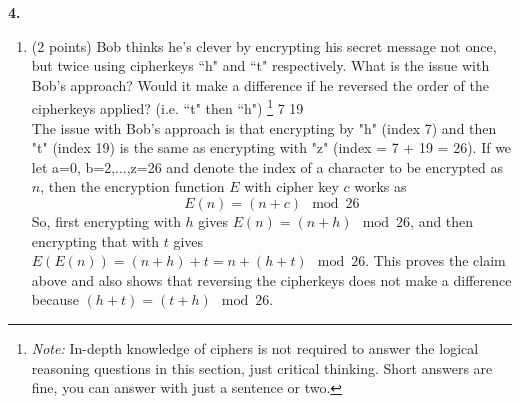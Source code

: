 \documentclass[12pt]{amsart}
\newenvironment{statement}[1]{\smallskip\noindent\color[rgb]{0.0,0.0,0.0} {\bf #1.}}{}
\theoremstyle{definition}
\theoremstyle{remark}
\newcommand{\1}{\mathds{1}}
\begin{document}
\begin{statement}{4}
\begin{enumerate}
\begin{enumerate}
            \item (2 points) Bob thinks he's clever by encrypting his secret message not once, but twice using cipherkeys ``h" and ``t" respectively. What is the issue with Bob's approach? Would it make a difference if he reversed the order of the cipherkeys applied? (i.e. ``t" then ``h") \footnote{\textit{Note:} In-depth knowledge of ciphers is not required to answer the logical reasoning questions in this section, just critical thinking. Short answers are fine, you can answer with just a sentence or two.}
            7 19 
            \\The issue with Bob's approach is that encrypting by "h" (index 7) and then "t" (index 19) is the same as encrypting with 
            "z" (index = 7 + 19  = 26). If we let a=0, b=2,...,z=26 and denote the index of a character to be encrypted as $n$, then the encryption function 
            $E$ with cipher key $c$ works as 
            $$
                E(n) = (n + c) \mod 26
            $$
            So, first encrypting with $h$ gives $E(n) = (n + h) \mod 26$, and then encrypting that with $t$ gives $E(E(n)) = (n + h) + t = n + (h + t) \mod 26$. This proves the claim above 
            and also shows that reversing the cipherkeys does not make a difference because $(h + t) = (t + h) \mod 26$. 
        \end{enumerate}
        

\end{enumerate}
\end{statement}
\end{document}
